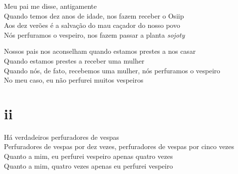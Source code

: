 \begin{linenumbers}
 \noindent Meu pai me disse, antigamente\\
 Quando temos dez anos de idade, nos fazem receber o Osiip\\
 Aos dez verões é a salvação do mau caçador do nosso povo\\
 Nós perfuramos o vespeiro, nos fazem passar a planta \textit{sojoty}

\end{linenumbers}

\bigskip

\begin{linenumbers}
 
\noindent Nossos pais nos aconselham quando estamos prestes a nos casar\\
 Quando estamos prestes a receber uma mulher\\
 Quando nós, de fato, recebemos uma mulher, nós perfuramos o vespeiro\\
 No meu caso, eu não perfurei muitos vespeiros
 
 
\medskip
\section{ii}

 \noindent Há verdadeiros perfuradores de vespas\\
 Perfuradores de vespas por dez vezes, perfuradores de vespas por cinco vezes\\
 Quanto a mim, eu perfurei vespeiro apenas quatro vezes\\
 Quanto a mim, quatro vezes apenas eu perfurei vespeiro
 
\end{linenumbers}

